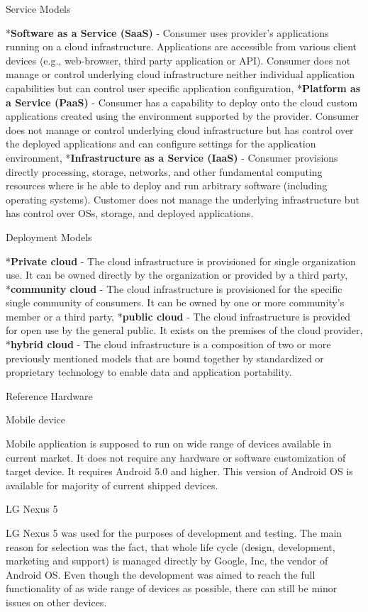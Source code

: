\seccc Service Models

\begitems
	*{\bf Software as a Service (SaaS)} - Consumer uses provider's applications running on a cloud infrastructure. Applications are accessible from various client devices (e.g., web-browser, third party application or API). Consumer does not manage or control underlying cloud infrastructure neither individual application capabilities but can control user specific application configuration,
	*{\bf Platform as a Service (PaaS)} - Consumer has a capability to deploy onto the cloud custom applications created using the environment supported by the provider. Consumer does not manage or control underlying cloud infrastructure but has control over the deployed applications and can configure settings for the application environment,
	*{\bf Infrastructure as a Service (IaaS)} - Consumer provisions directly processing, storage, networks, and other fundamental computing resources where is he able to deploy and run arbitrary software (including operating systems). Customer does not manage the underlying infrastructure but has control over OSs, storage, and deployed applications.
\enditems

\seccc Deployment Models

\begitems
	*{\bf Private cloud} - The cloud infrastructure is provisioned for single organization use. It can be owned directly by the organization or provided by a third party,
	*{\bf community cloud} - The cloud infrastructure is provisioned for the specific single community of consumers. It can be owned by one or more community's member or a third party,
	*{\bf public cloud} - The cloud infrastructure is provided for open use by the general public. It exists on the premises of the cloud provider,
	*{\bf hybrid cloud} - The cloud infrastructure is a composition of two or more previously mentioned models that are bound together by standardized or proprietary technology to enable data and application portability.
	
\enditems

\sec Reference Hardware

\secc Mobile device

Mobile application is supposed to run on wide range of devices available in current market. It does not require any hardware or software customization of target device. It requires Android 5.0 and higher. This version of Android OS is available for majority of current shipped devices.

\seccc LG Nexus 5

LG Nexus 5 was used for the purposes of development and testing. The main reason for selection was the fact, that whole life cycle (design, development, marketing and support) is managed directly by Google, Inc, the vendor of Android OS. Even though the development was aimed to reach the full functionality of as wide range of devices as possible, there can still be minor issues on other devices. 

